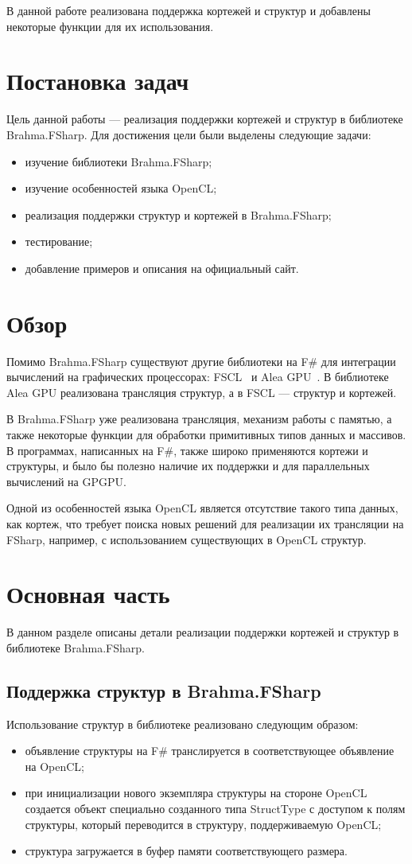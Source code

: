 \documentclass[14pt]{matmex-diploma}
\begin{document}
В данной работе реализована поддержка кортежей и структур и добавлены некоторые функции для их использования.

\section{Постановка задач}
Цель данной работы — реализация поддержки кортежей и структур в библиотеке Brahma.FSharp. Для достижения цели были выделены следующие задачи:
\begin{itemize}
\item изучение библиотеки Brahma.FSharp;
\item изучение особенностей языка OpenCL;
\item реализация поддержки структур и кортежей в Brahma.FSharp;
\item тестирование;
\item добавление примеров и описания на официальный сайт.
\end{itemize}

\section {Обзор}
Помимо Brahma.FSharp существуют другие библиотеки на F\# для интеграции вычислений на графических процессорах: FSCL~\cite{fscl} и Alea GPU~\cite{aleagpu}. В библиотеке Alea GPU реализована трансляция структур, а в  FSCL — структур и кортежей.

В Brahma.FSharp уже реализована трансляция, механизм работы с памятью, а также некоторые функции для обработки примитивных типов данных и массивов. В программах, написанных на F\#, также широко применяются кортежи и структуры, и было бы полезно наличие их поддержки и для параллельных вычислений на GPGPU.

Одной из особенностей языка OpenCL является отсутствие такого типа данных, как кортеж, что требует поиска новых решений для реализации их трансляции на FSharp, например, с использованием существующих в OpenCL структур.

\section {Основная часть}
В данном разделе описаны детали реализации поддержки кортежей и структур в библиотеке Brahma.FSharp.
 
\subsection {Поддержка структур в Brahma.FSharp}
Использование структур в библиотеке реализовано следующим образом: 
\begin{itemize}
\item объявление структуры на F\# транслируется в соответствующее объявление на OpenCL; 
\item при инициализации нового экземпляра структуры на стороне OpenCL создается объект специально созданного типа StructType с доступом к полям структуры, который переводится в структуру, поддерживаемую OpenCL;
\item структура загружается в буфер памяти соответствующего размера.
\end{itemize}
\end{document}
